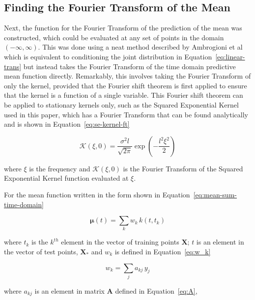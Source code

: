 \documentclass[12pt]{article}
\begin{document}
    \subsection{Finding the Fourier Transform of the Mean}
    Next, the function for the Fourier Transform of the prediction of the mean was constructed, which could be evaluated at any set of points in the domain $(-\infty, \infty)$.
    This was done using a neat method described by Ambrogioni et al~\cite{Ambrogioni2018} which is equivalent to conditioning the joint distribution in Equation~\ref{eq:linear-trans} but instead takes the Fourier Transform of the time domain predictive mean function directly.
    Remarkably, this involves taking the Fourier Transform of only the kernel, provided that the Fourier shift theorem is first applied to ensure that the kernel is a function of a single variable.
    This Fourier shift theorem can be applied to stationary kernels only, such as the Squared Exponential Kernel used in this paper, which has a Fourier Transform that can be found analytically and is shown in Equation~\ref{eq:se-kernel-ft}

    \begin{equation}
        \mathcal{K}(\xi,0) = \frac{\sigma^2 l}{\sqrt{2 \pi}} \exp\left(-\frac{l^2 \xi^2}{2}\right) \label{eq:se-kernel-ft}
    \end{equation}

    \noindent where $\xi$ is the frequency and $\mathcal{K}(\xi,0)$ is the Fourier Transform of the Squared Exponential Kernel function evaluated at $\xi$.

    For the mean function written in the form shown in Equation~\ref{eq:mean-sum-time-domain}

    \begin{equation}
        \mathbf{\mu}(t) = \sum_{k} w_k \, k(t,t_k) \label{eq:mean-sum-time-domain}
    \end{equation}

    \noindent where $t_k$ is the $k^{th}$ element in the vector of training points $\mathbf{X}$; $t$ is an element in the vector of test points, $\mathbf{X}_*$ and $w_k$ is defined in Equation~\ref{eq:w_k}

    \begin{equation}
        w_k = \sum_{j} a_{kj} \, y_j \label{eq:w_k}
    \end{equation}

    \noindent where $a_{kj}$ is an element in matrix $\mathbf{A}$ defined in Equation~\ref{eq:A},
\end{document}
